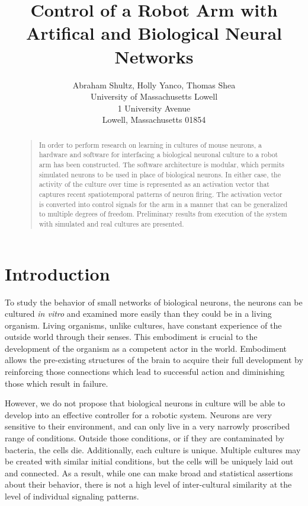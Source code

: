 \documentclass[letterpaper]{article}
\begin{document}
%
\title{Control of a Robot Arm with Artifical and Biological Neural Networks}
\author{Abraham Shultz, Holly Yanco, Thomas Shea\\
University of Massachusetts Lowell\\
1 University Avenue\\
Lowell, Massachusetts 01854\\
}
\maketitle
\begin{abstract}
\begin{quote}
In order to perform research on learning in cultures of mouse neurons, a hardware and software for interfacing a biological neuronal culture to a robot arm has been constructed. 
The software architecture is modular, which permits simulated neurons to be used in place of biological neurons. 
In either case, the activity of the culture over time is represented as an activation vector that captures recent spatiotemporal patterns of neuron firing. 
The activation vector is converted into control signals for the arm in a manner that can be generalized to multiple degrees of freedom. 
Preliminary results from execution of the system with simulated and real cultures are presented. 
\end{quote}
\end{abstract}

\section{Introduction}

To study the behavior of small networks of biological neurons, the neurons can be cultured \textit{in vitro} and examined more easily than they could be in a living organism. 
Living organisms, unlike cultures, have constant experience of the outside world through their senses. 
This embodiment is crucial to the development of the organism as a competent actor in the world.
Embodiment allows the pre-existing structures of the brain to acquire their full development by reinforcing those connections which lead to successful action and diminishing those which result in failure. 

However, we do not propose that biological neurons in culture will be able to develop into an effective controller for a robotic system.
Neurons are very sensitive to their environment, and can only live in a very narrowly proscribed range of conditions. 
Outside those conditions, or if they are contaminated by bacteria, the cells die. 
Additionally, each culture is unique. Multiple cultures may be created with similar initial conditions, but the cells will be uniquely laid out and connected. 
As a result, while one can make broad and statistical assertions about their behavior, there is not a high level of inter-cultural similarity at the level of individual signaling patterns. 
\end{document}
